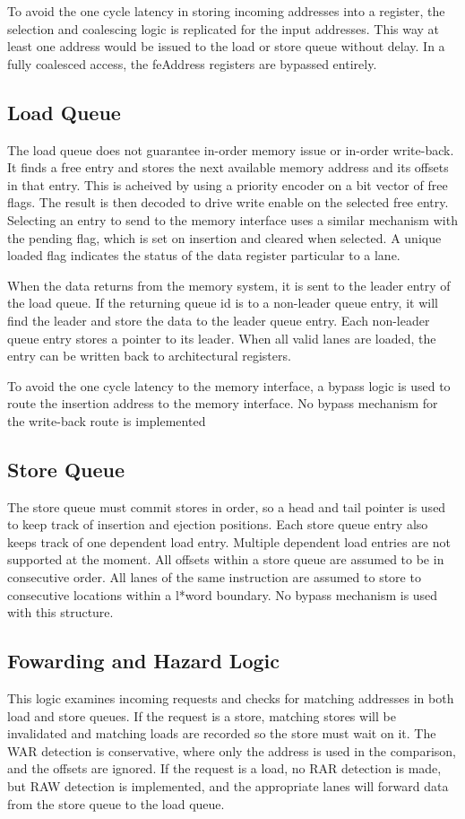 To avoid the one cycle latency in storing incoming addresses into a register, the selection and coalescing logic is replicated for the input addresses. This way at least one address would be issued to the load or store queue without delay. In a fully coalesced access, the feAddress registers are bypassed entirely.

\subsection{Load Queue}
The load queue does not guarantee in-order memory issue or in-order write-back. It finds a free entry and stores the next available memory address and its offsets in that entry. This is acheived by using a priority encoder on a bit vector of free flags. The result is then decoded to drive write enable on the selected free entry. Selecting an entry to send to the memory interface uses a similar mechanism with the pending flag, which is set on insertion and cleared when selected. A unique loaded flag indicates the status of the data register particular to a lane. 

When the data returns from the memory system, it is sent to the leader entry of the load queue. If the returning queue id is to a non-leader queue entry, it will find the leader and store the data to the leader queue entry. Each non-leader queue entry stores a pointer to its leader. When all valid lanes are loaded, the entry can be written back to architectural registers.

To avoid the one cycle latency to the memory interface, a bypass logic is used to route the insertion address to the memory interface. No bypass mechanism for the write-back route is implemented

\subsection{Store Queue}
The store queue must commit stores in order, so a head and tail pointer is used to keep track of insertion and ejection positions. Each store queue entry also keeps track of one dependent load entry. Multiple dependent load entries are not supported at the moment. All offsets within a store queue are assumed to be in consecutive order. All lanes of the same instruction are assumed to store to consecutive locations within a l*word boundary. No bypass mechanism is used with this structure.

\subsection{Fowarding and Hazard Logic}
This logic examines incoming requests and checks for matching addresses in both load and store queues. If the request is a store, matching stores will be invalidated and matching loads are recorded so the store must wait on it. The WAR detection is conservative, where only the address is used in the comparison, and the offsets are ignored. If the request is a load, no RAR detection is made, but RAW detection is implemented, and the appropriate lanes will forward data from the store queue to the load queue. 


